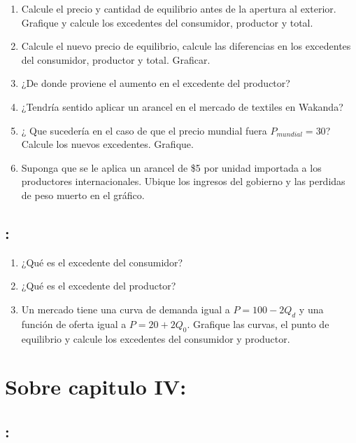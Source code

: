 \documentclass[
  letterpaper,
  DIV=11,
  numbers=noendperiod]{scrreport}
\begin{document}
\begin{enumerate}
\def\labelenumi{\alph{enumi})}
\item
  Calcule el precio y cantidad de equilibrio antes de la apertura al
  exterior. Grafique y calcule los excedentes del consumidor, productor
  y total.
\item
  Calcule el nuevo precio de equilibrio, calcule las diferencias en los
  excedentes del consumidor, productor y total. Graficar.
\item
  ¿De donde proviene el aumento en el excedente del productor?
\item
  ¿Tendría sentido aplicar un arancel en el mercado de textiles en
  Wakanda?
\item
  ¿ Que sucedería en el caso de que el precio mundial fuera
  \(P_{mundial}=30\)? Calcule los nuevos excedentes. Grafique.
\item
  Suponga que se le aplica un arancel de \$5 por unidad importada a los
  productores internacionales. Ubique los ingresos del gobierno y las
  perdidas de peso muerto en el gráfico.
\end{enumerate}

\hypertarget{section-54}{%
\subsection{:}\label{section-54}}

\begin{enumerate}
\def\labelenumi{\alph{enumi})}
\item
  ¿Qué es el excedente del consumidor?
\item
  ¿Qué es el excedente del productor?
\item
  Un mercado tiene una curva de demanda igual a \(P = 100 - 2Q_d\) y una
  función de oferta igual a \(P = 20 + 2Q_0\). Grafique las curvas, el
  punto de equilibrio y calcule los excedentes del consumidor y
  productor.
\end{enumerate}

\hypertarget{sobre-capitulo-iv}{%
\section{Sobre capitulo IV:}\label{sobre-capitulo-iv}}

\hypertarget{section-55}{%
\subsection{:}\label{section-55}}
\end{document}
